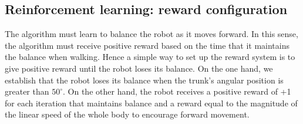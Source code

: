 \subsection{Reinforcement learning: reward configuration}
The algorithm must learn to balance the robot as it moves forward. In this sense, the algorithm must receive positive reward based on the time that it maintains the balance when walking. Hence a simple way to set up the reward system is to give positive reward until the robot loses its balance. On the one hand, we establish that the robot loses its balance when the trunk's angular position is greater than $50^{\circ}$. On the other hand, the robot receives a positive reward of +1 for each iteration that maintains balance and a reward equal to the magnitude of the linear speed of the whole body to encourage forward movement.
